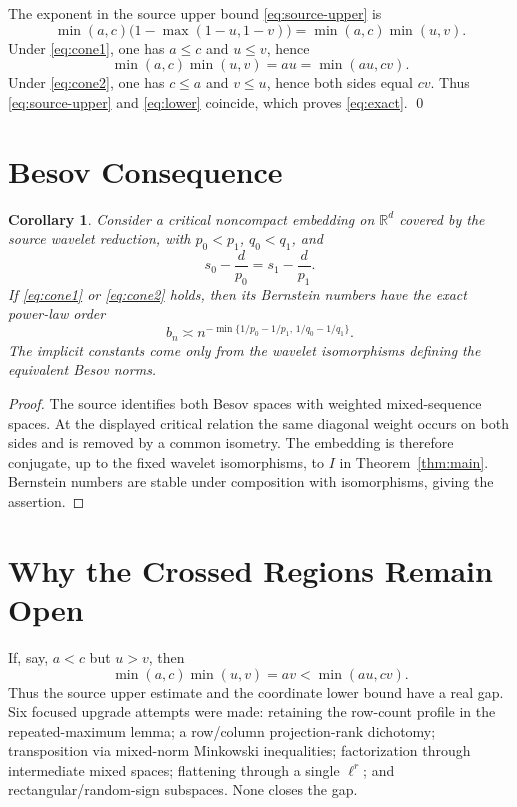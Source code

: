 \documentclass[11pt]{article}
\newtheorem{corollary}{Corollary}
\begin{document}
The exponent in the source upper bound \eqref{eq:source-upper} is
\begin{equation}\label{eq:paperexp}
 \min(a,c)\bigl(1-\max(1-u,1-v)\bigr)
 =\min(a,c)\min(u,v).
\end{equation}
Under \eqref{eq:cone1}, one has $a\le c$ and $u\le v$, hence
\[
 \min(a,c)\min(u,v)=au=\min(au,cv).
\]
Under \eqref{eq:cone2}, one has $c\le a$ and $v\le u$, hence both sides
equal $cv$.  Thus \eqref{eq:source-upper} and \eqref{eq:lower} coincide,
which proves \eqref{eq:exact}. \qed

\section*{Besov Consequence}

\begin{corollary}
Consider a critical noncompact embedding on $\mathbb R^d$ covered by the
source wavelet reduction, with $p_0<p_1$, $q_0<q_1$, and
\[
 s_0-\frac d{p_0}=s_1-\frac d{p_1}.
\]
If \eqref{eq:cone1} or \eqref{eq:cone2} holds, then its Bernstein numbers
have the exact power-law order
\[
 b_n\asymp
 n^{-\min\{1/p_0-1/p_1,\,1/q_0-1/q_1\}}.
\]
The implicit constants come only from the wavelet isomorphisms defining
the equivalent Besov norms.
\end{corollary}

\begin{proof}
The source identifies both Besov spaces with weighted mixed-sequence
spaces.  At the displayed critical relation the same diagonal weight
occurs on both sides and is removed by a common isometry.  The embedding is
therefore conjugate, up to the fixed wavelet isomorphisms, to $I$ in
Theorem~\ref{thm:main}.  Bernstein numbers are stable under composition
with isomorphisms, giving the assertion.
\end{proof}

\section*{Why the Crossed Regions Remain Open}

If, say, $a<c$ but $u>v$, then
\[
 \min(a,c)\min(u,v)=av
 <\min(au,cv).
\]
Thus the source upper estimate and the coordinate lower bound have a real
gap.  Six focused upgrade attempts were made: retaining the row-count
profile in the repeated-maximum lemma; a row/column projection-rank
dichotomy; transposition via mixed-norm Minkowski inequalities;
factorization through intermediate mixed spaces; flattening through a
single $\ell^r$; and rectangular/random-sign subspaces.  None closes the
gap.
\end{document}
